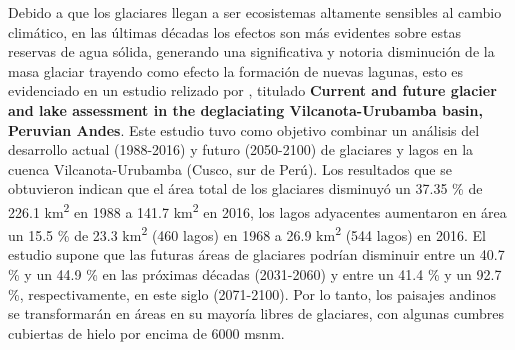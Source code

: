 Debido a que los glaciares llegan a ser ecosistemas altamente sensibles al cambio climático, en las últimas décadas los efectos son más evidentes sobre estas reservas de agua sólida, generando una significativa y notoria disminución de la masa glaciar trayendo como efecto la formación de nuevas lagunas, esto es evidenciado en un estudio relizado por \parencite{drenkhan2018current}, titulado \textbf{Current and future glacier and lake assessment in the deglaciating Vilcanota-Urubamba basin, Peruvian Andes}. Este estudio tuvo como objetivo combinar un análisis del desarrollo actual (1988-2016) y futuro (2050-2100) de glaciares y lagos en la cuenca Vilcanota-Urubamba (Cusco, sur de Perú). Los resultados que se obtuvieron indican que el área total de los glaciares disminuyó un 37.35 {\%} de 226.1 km\textsuperscript{2} en 1988 a 141.7 km\textsuperscript{2} en 2016, los lagos adyacentes aumentaron en área un 15.5 {\%} de 23.3 km\textsuperscript{2} (460 lagos) en 1968 a 26.9 km\textsuperscript{2} (544 lagos) en 2016. El estudio supone que las futuras áreas de glaciares podrían disminuir entre un 40.7 {\%} y un 44.9 {\%} en las próximas décadas (2031-2060) y entre un 41.4 {\%} y un 92.7 {\%}, respectivamente, en este siglo (2071­-2100). Por lo tanto, los paisajes andinos se transformarán en áreas en su mayoría libres de glaciares, con algunas cumbres cubiertas de hielo por encima de 6000 msnm. 


